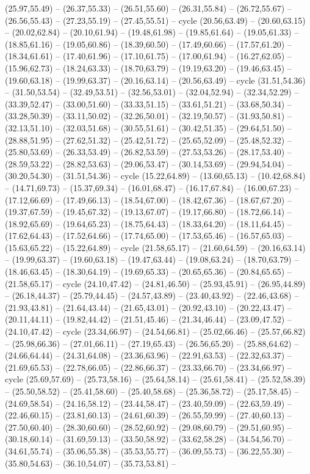 {(25.97,55.49) -- (26.37,55.33) -- (26.51,55.60) -- (26.31,55.84) -- (26.72,55.67) -- (26.56,55.43) -- (27.23,55.19) -- (27.45,55.51) -- cycle (20.56,63.49) -- (20.60,63.15) -- (20.02,62.84) -- (20.10,61.94) -- (19.48,61.98) -- (19.85,61.64) -- (19.05,61.33) -- (18.85,61.16) -- (19.05,60.86) -- (18.39,60.50) -- (17.49,60.66) -- (17.57,61.20) -- (18.34,61.61) -- (17.40,61.96) -- (17.10,61.75) -- (17.00,61.94) -- (16.27,62.05) -- (15.96,62.73) -- (18.24,63.33) -- (18.70,63.79) -- (19.19,63.20) -- (19.46,63.45) -- (19.60,63.18) -- (19.99,63.37) -- (20.16,63.14) -- (20.56,63.49) -- cycle (31.51,54.36) -- (31.50,53.54) -- (32.49,53.51) -- (32.56,53.01) -- (32.04,52.94) -- (32.34,52.29) -- (33.39,52.47) -- (33.00,51.60) -- (33.33,51.15) -- (33.61,51.21) -- (33.68,50.34) -- (33.28,50.39) -- (33.11,50.02) -- (32.26,50.01) -- (32.19,50.57) -- (31.93,50.81) -- (32.13,51.10) -- (32.03,51.68) -- (30.55,51.61) -- (30.42,51.35) -- (29.64,51.50) -- (28.88,51.95) -- (27.62,51.32) -- (25.42,51.72) -- (25.65,52.09) -- (25.48,52.32) -- (25.80,53.69) -- (26.33,53.49) -- (26.82,53.59) -- (27.53,53.26) -- (28.17,53.40) -- (28.59,53.22) -- (28.82,53.63) -- (29.06,53.47) -- (30.14,53.69) -- (29.94,54.04) -- (30.20,54.30) -- (31.51,54.36) -- cycle (15.22,64.89) -- (13.60,65.13) -- (10.42,68.84) -- (14.71,69.73) -- (15.37,69.34) -- (16.01,68.47) -- (16.17,67.84) -- (16.00,67.23) -- (17.12,66.69) -- (17.49,66.13) -- (18.54,67.00) -- (18.42,67.36) -- (18.67,67.20) -- (19.37,67.59) -- (19.45,67.32) -- (19.13,67.07) -- (19.17,66.80) -- (18.72,66.14) -- (18.92,65.69) -- (19.64,65.23) -- (18.75,64.43) -- (18.33,64.20) -- (18.11,64.45) -- (17.62,64.43) -- (17.52,64.66) -- (17.74,65.00) -- (17.53,65.46) -- (16.57,65.03) -- (15.63,65.22) -- (15.22,64.89) -- cycle (21.58,65.17) -- (21.60,64.59) -- (20.16,63.14) -- (19.99,63.37) -- (19.60,63.18) -- (19.47,63.44) -- (19.08,63.24) -- (18.70,63.79) -- (18.46,63.45) -- (18.30,64.19) -- (19.69,65.33) -- (20.65,65.36) -- (20.84,65.65) -- (21.58,65.17) -- cycle (24.10,47.42) -- (24.81,46.50) -- (25.93,45.91) -- (26.95,44.89) -- (26.18,44.37) -- (25.79,44.45) -- (24.57,43.89) -- (23.40,43.92) -- (22.46,43.68) -- (21.93,43.81) -- (21.64,43.44) -- (21.65,43.01) -- (20.92,43.10) -- (20.22,43.47) -- (20.11,44.11) -- (19.82,44.42) -- (21.51,45.46) -- (21.34,46.44) -- (23.09,47.52) -- (24.10,47.42) -- cycle (23.34,66.97) -- (24.54,66.81) -- (25.02,66.46) -- (25.57,66.82) -- (25.98,66.36) -- (27.01,66.11) -- (27.19,65.43) -- (26.56,65.20) -- (25.88,64.62) -- (24.66,64.44) -- (24.31,64.08) -- (23.36,63.96) -- (22.91,63.53) -- (22.32,63.37) -- (21.69,65.53) -- (22.78,66.05) -- (22.86,66.37) -- (23.33,66.70) -- (23.34,66.97) -- cycle (25.69,57.69) -- (25.73,58.16) -- (25.64,58.14) -- (25.61,58.41) -- (25.52,58.39) -- (25.50,58.52) -- (25.41,58.60) -- (25.40,58.68) -- (25.36,58.72) -- (25.17,58.45) -- (24.69,58.54) -- (24.16,58.12) -- (23.44,58.47) -- (23.40,59.09) -- (22.63,59.49) -- (22.46,60.15) -- (23.81,60.13) -- (24.61,60.39) -- (26.55,59.99) -- (27.40,60.13) -- (27.50,60.40) -- (28.30,60.60) -- (28.52,60.92) -- (29.08,60.79) -- (29.51,60.95) -- (30.18,60.14) -- (31.69,59.13) -- (33.50,58.92) -- (33.62,58.28) -- (34.54,56.70) -- (34.61,55.74) -- (35.06,55.38) -- (35.53,55.77) -- (36.09,55.73) -- (36.22,55.30) -- (35.80,54.63) -- (36.10,54.07) -- (35.73,53.81) -- }
